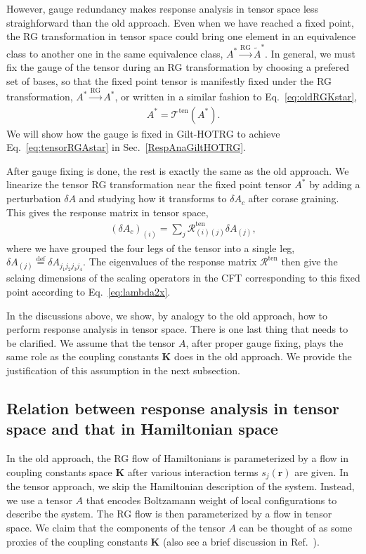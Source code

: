 \documentclass[aps,prb,reprint,superscriptaddress]{revtex4-2}
\newcommand{\defeq}{\stackrel{\text{def}}{=}}
\begin{document}
However, gauge redundancy makes response analysis in tensor space less
straighforward than the old approach. Even when we have reached a fixed
point, the RG transformation in tensor space could bring one element in
an equivalence class to another one in the same equivalence class, $A^*
\xrightarrow{\text{RG}} \tilde{A}^*$. In general, we must fix the gauge
of the tensor during an RG transformation by choosing a prefered set of
bases, so that the fixed point tensor is manifestly fixed under the RG
transformation, $A^* \xrightarrow{\text{RG}} A^*$, or written in a
similar fashion to Eq.~\eqref{eq:oldRGKstar},
%
\begin{align}\label{eq:tensorRGAstar}
    A^* = \mathcal{T}^{\text{ten}}\left(A^* \right).
\end{align}
%
We will show how the gauge is fixed in Gilt-HOTRG to achieve
Eq.~\eqref{eq:tensorRGAstar} in Sec.~\ref{RespAnaGiltHOTRG}.
%

After gauge fixing is done, the rest is exactly the same as the old
approach. We linearize the tensor RG transformation near the fixed point
tensor $A^*$ by adding a perturbation $\delta A$ and studying how it
transforms to $\delta A_c$ after corase graining. This gives the
response matrix in tensor space,
%
\begin{align}\label{eq:respMatTen}
    \left(\delta A_c\right)_{(i)} = \sum_j
    \mathcal{R}^{\text{ten}}_{(i)(j)} \delta A_{(j)},
\end{align}
%
where we have grouped the four legs of the tensor into a single leg,
$\delta A_{(j)} \defeq \delta A_{j_1 j_2 j_3 j_4}$. The eigenvalues of
the response matrix $\mathcal{R}^{\text{ten}}$ then give the sclaing
dimensions of the scaling operators in the CFT corresponding to this
fixed point according to Eq.~\eqref{eq:lambda2x}.
%

In the discussions above, we show, by analogy to the old approach, how
to perform response analysis in tensor space. There is one last thing
that needs to be clarified. We assume that the tensor $A$, after proper
gauge fixing, plays the same role as the coupling constants
$\mathbf{K}$ does in the old approach. We provide the justification of
this assumption in the next subsection.
%


\subsection{Relation between response analysis in tensor space and that
in Hamiltonian space\label{relateTensorCoupling}}
In the old approach, the RG flow of Hamiltonians is parameterized by a
flow in coupling constants space $\mathbf{K}$ after various interaction
terms $s_j(\mathbf{r})$ are given. In the tensor approach, we skip the
Hamiltonian description of the system. Instead, we use a tensor $A$
that encodes Boltzamann weight of local configurations to describe the
system. The RG flow is then parameterized by a flow in tensor space. We
claim that the components of the tensor $A$ can be thought of as some
proxies of the coupling constants $\mathbf{K}$ (also see a brief
discussion in Ref.~\cite{GuWen2009}).
%
\end{document}
